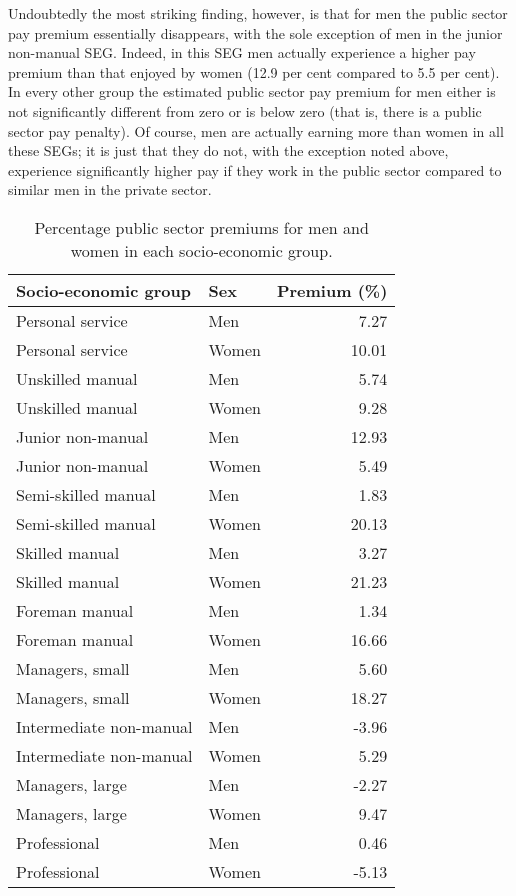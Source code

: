 \documentclass[a4paper,11pt,titlepage]{article}
\begin{document}
Undoubtedly the most striking finding, however, is that for men the public sector pay premium essentially disappears, with the sole exception of men in the junior non-manual SEG.  Indeed, in this SEG men actually experience a higher pay premium than that enjoyed by women (12.9 per cent compared to 5.5 per cent).  In every other group the estimated public sector pay premium for men either is not significantly different from zero or is below zero (that is, there is a public sector pay penalty).  Of course, men are actually earning more than women in all these SEGs; it is just that they do not, with the exception noted above, experience significantly higher pay if they work in the public sector compared to similar men in the private sector.


\begin{table}[ht]
    \caption{Percentage public sector premiums for men and women in each socio-economic group. \label{tab:fullprem}}
    \begin{center}
    \begin{tabular}{llr}
\toprule
     Socio-economic group & Sex & Premium (\%) \\
\midrule
  Personal service & Men & 7.27 \\
  Personal service & Women & 10.01 \\
  Unskilled manual & Men & 5.74 \\
  Unskilled manual & Women & 9.28 \\
  Junior non-manual & Men & 12.93 \\
  Junior non-manual & Women & 5.49 \\
  Semi-skilled manual& Men & 1.83 \\
  Semi-skilled manual & Women & 20.13 \\
  Skilled manual & Men & 3.27 \\
  Skilled manual & Women & 21.23 \\
  Foreman manual & Men & 1.34 \\
  Foreman manual & Women & 16.66 \\
  Managers, small & Men & 5.60 \\
  Managers, small & Women & 18.27 \\
  Intermediate non-manual& Men & -3.96 \\
  Intermediate non-manual & Women & 5.29 \\
  Managers, large & Men & -2.27 \\
  Managers, large & Women & 9.47 \\
  Professional& Men & 0.46 \\
  Professional& Women & -5.13 \\
\bottomrule
    \end{tabular}
    \end{center}
\end{table}
\end{document}
